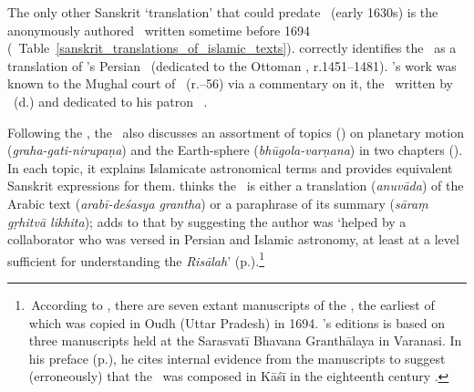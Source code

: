 The only other Sanskrit `translation' that could predate \Siddhantasindhu\ (early 1630s) is the anonymously authored \Hayatagrantha\ written sometime before 1694 (\vid\ Table~\ref{sanskrit_translations_of_islamic_texts}). \textcite[327]{PingreeIslamAstSkt} correctly identifies the \Hayatagrantha\ as a translation of \aliQushji's Persian \Risaladarilmalhaya\ (dedicated to the Ottoman \MehmetII, r.\@ 1451--1481). \aliQushji's work was known to the Mughal court of \Humayun\ (r.--56) via a commentary on it, the \SharhilmalHaya\ written by \MuslihalDinMuhammadLari\ (d.) and dedicated to his patron \Humayun\ \parencite[296]{Pourjavady}. 

Following the \SharhilmalHaya, the \Hayatagrantha\ also discusses an assortment of topics (\prakarana) on planetary motion (\textit{graha-gati-nirupaṇa}) and the Earth-sphere (\textit{bhūgola-varṇana}) in two chapters (\adhyaya). In each topic, it explains Islamicate astronomical terms and provides equivalent Sanskrit expressions for them. \textcite[p. of the preface]{BhattacaryaHayata} thinks the \Hayatagrantha\ is either a translation (\textit{anuvāda}) of the Arabic text (\textit{arabī-deśasya grantha}) or a paraphrase of its summary (\textit{sāraṃ gṛhitvā likhita}); \textcite{PingreeIndianReception} adds to that by suggesting the author was `helped by a collaborator who was versed in Persian and Islamic astronomy, at least at a level sufficient for understanding the \textit{Risālah}' (p.).\footnote{\,According to \textcite[CESS A4, p.\thinspace 57ab]{PingreeCESS}, there are seven extant manuscripts of the \Hayatagrantha, the earliest of which was copied in Oudh (Uttar Pradesh) in 1694. \citeauthor{BhattacaryaHayata}'s editions is based on three manuscripts held at the Sarasvatī Bhavana Granthālaya in Varanasi. In his preface (p.), he cites internal evidence from the manuscripts to suggest (erroneously) that the \Hayatagrantha\ was composed in Kāśī in the eighteenth century \parencite[\vid][326--327]{PingreeIslamAstSkt}.} 

